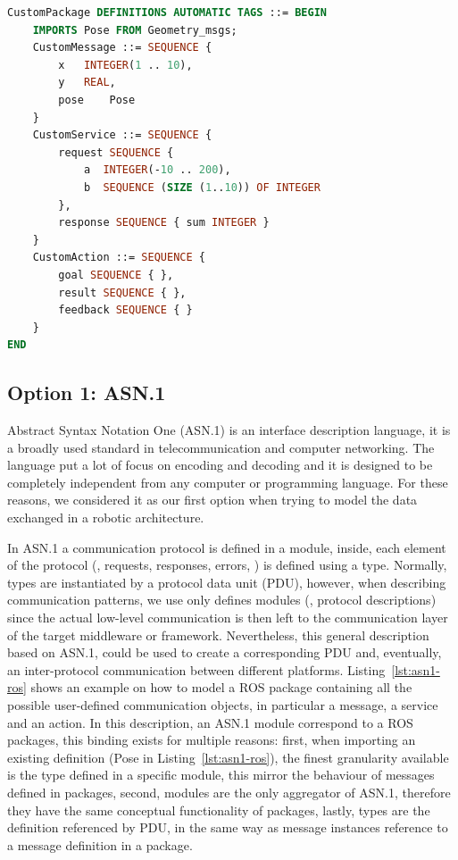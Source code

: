 \begin{lstlisting}[float,language=ASN1,caption={ROS message, service and action definition using ASN.1},label=lst:asn1-ros]
CustomPackage DEFINITIONS AUTOMATIC TAGS ::= BEGIN
	IMPORTS Pose FROM Geometry_msgs;
	CustomMessage ::= SEQUENCE {
		x	INTEGER(1 .. 10),
		y	REAL,
		pose	Pose
	}
	CustomService ::= SEQUENCE {
		request SEQUENCE {
			a  INTEGER(-10 .. 200),
			b  SEQUENCE (SIZE (1..10)) OF INTEGER
		},
		response SEQUENCE { sum INTEGER }
	}
	CustomAction ::= SEQUENCE {
		goal SEQUENCE { },
		result SEQUENCE { },
		feedback SEQUENCE { }
	}
END
\end{lstlisting}

\subsection{Option 1: ASN.1}
Abstract Syntax Notation One (ASN.1) is an interface description language, it is a broadly used standard in telecommunication and computer networking. The language put a lot of focus on encoding and decoding and it is designed to be completely independent from any computer or programming language. For these reasons, we considered it as our first option when trying to model the data exchanged in a robotic architecture.

In ASN.1 a communication protocol is defined in a module, inside, each element of the protocol (\eg, requests, responses, errors, \etc) is defined using a type. Normally, types are instantiated by a protocol data unit (PDU), however, when describing communication patterns, we use only defines modules (\ie, protocol descriptions) since the actual low-level communication is then left to the communication layer of the target middleware or framework. Nevertheless, this general description based on ASN.1, could be used to create a corresponding PDU and, eventually, an inter-protocol communication between different platforms. Listing~\ref{lst:asn1-ros} shows an example on how to model a ROS package containing all the possible user-defined communication objects, in particular a message, a service and an action. In this description, an ASN.1 module correspond to a ROS packages, this binding exists for multiple reasons: first, when importing an existing definition (Pose in Listing~\ref{lst:asn1-ros}), the finest granularity available is the type defined in a specific module, this mirror the behaviour of messages defined in packages, second, modules are the only aggregator of ASN.1, therefore they have the same conceptual functionality of packages, lastly, types are the definition referenced by PDU, in the same way as message instances reference to a message definition in a package.

